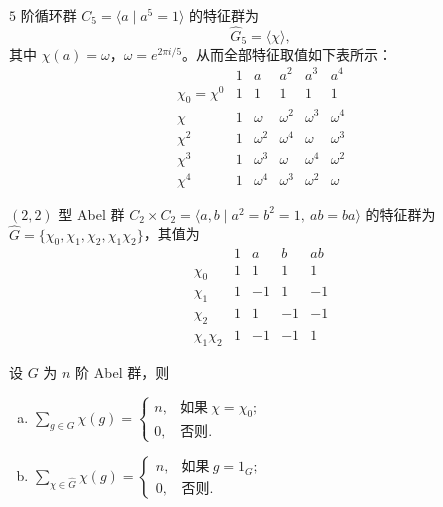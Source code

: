 \begin{example}
$5$ 阶循环群 $C_5=\langle a\mid a^5=1\rangle$ 的特征群为
\[
  \widehat{G}_5=\langle\chi\rangle,
\]
其中 $\chi(a)=\omega$，$\omega=e^{2\pi i/5}$。从而全部特征取值如下表所示：
\[
  \begin{array}{c|ccccc}
    & 1 & a & a^2 & a^3 & a^4\\ \hline
    \chi_0=\chi^0 & 1 & 1 & 1 & 1 & 1\\
    \chi & 1 & \omega & \omega^2 & \omega^3 & \omega^4\\
    \chi^2 & 1 & \omega^2 & \omega^4 & \omega & \omega^3\\
    \chi^3 & 1 & \omega^3 & \omega & \omega^4 & \omega^2\\
    \chi^4 & 1 & \omega^4 & \omega^3 & \omega^2 & \omega
  \end{array}
\]
\end{example}

\begin{example}
$(2,2)$ 型 Abel 群 $C_2\times C_2=\langle a,b\mid a^2=b^2=1,\ ab=ba\rangle$ 的特征群为 $\widehat{G}=\{\chi_0,\chi_1,\chi_2,\chi_1\chi_2\}$，其值为
\[
  \begin{array}{c|cccc}
    & 1 & a & b & ab\\ \hline
    \chi_0 & 1 & 1 & 1 & 1\\
    \chi_1 & 1 & -1 & 1 & -1\\
    \chi_2 & 1 & 1 & -1 & -1\\
    \chi_1\chi_2 & 1 & -1 & -1 & 1
  \end{array}
\]
\end{example}

\begin{theorem}\label{thm:4.6}
设 $G$ 为 $n$ 阶 Abel 群，则
\begin{enumerate}[(a)]
  \item $\sum_{g\in G}\chi(g)=\begin{cases}n, & \text{如果}\ \chi=\chi_0;\\ 0, & \text{否则}.\end{cases}$
  \item $\sum_{\chi\in\widehat{G}}\chi(g)=\begin{cases}n, & \text{如果}\ g=1_G;\\ 0, & \text{否则}.\end{cases}$
\end{enumerate}
\end{theorem}

